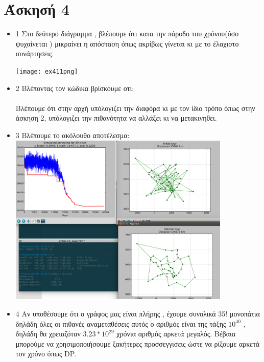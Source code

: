 \documentclass{article}
\begin{document}
\section*{Άσκησή 4}
\begin{itemize}
	\item 1
		Στο δεύτερο διάγραμμα , βλέπουμε ότι κατα την πάροδο του χρόνου(όσο ψυχαίνεται ) μικραίνει η απόσταση όπως ακρίβως γίνεται κι με το έλαχιστο συνάρτησεις.

		\texttt{[image: ex411png]} \\
	\item 2
		Βλέποντας τον κώδικα βρίσκουμε οτι:\\


\\
Βλέπουμε ότι στην αρχή υπόλογιζει την διαφόρα κι με τον ίδιο τρόπο όπως στην άσκηση 2, υπόλογιζει την πιθανότητα να αλλάξει κι να μετακινηθει.
 \item 3
Βλέπουμε το ακόλουθο αποτέλεσμα:\\
		\includegraphics[heigh=300pt,width=300pt]{ex422} \\
\item 4
	Αν υποθέσουμε ότι ο γράφος μας είναι πλήρης , έχουμε συνολικά 35! μονοπάτια δηλάδη όλες οι πιθανές αναμεταθέσεις αυτός ο αριθμός είναι της τάξης $10^{40}$ , δηλάδη θα χρειαζόταν $3.23*10^{29}$ χρόνια αριθμός αρκετά μεγαλός. Βέβαια μπορούμε να χρησιμοποιήσουμε ξακήτερες προσσεγγισεις ώστε να ρίξουμε αρκετά τον χρόνο όπως DP.
\end{itemize}
\end{document}

